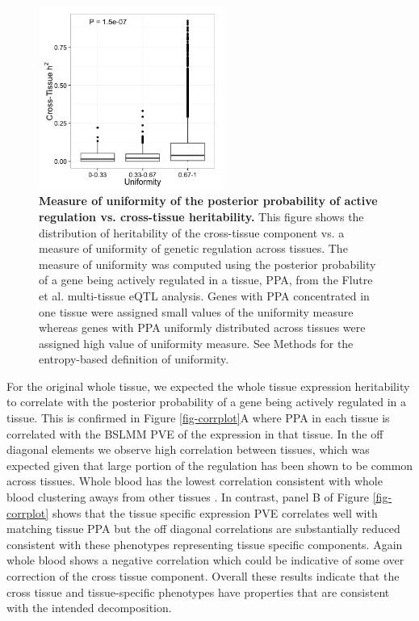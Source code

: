 \documentclass[10pt,letterpaper]{article}
\begin{document}
\begin{figure}[H]
\includegraphics[width=6cm]{Figures/Fig-CT-entropy.png}
\caption{{\bf Measure of uniformity of the posterior probability of active regulation vs. cross-tissue heritability.}
This figure shows the distribution of heritability of the cross-tissue component vs. a measure of uniformity of genetic regulation across tissues. 
The measure of uniformity was computed using the posterior probability of a gene being actively regulated in a tissue, PPA, from the Flutre et al. \cite{Flutre_2013} multi-tissue eQTL analysis. Genes with PPA concentrated in one tissue were assigned small values of the uniformity measure whereas genes with PPA uniformly distributed across tissues were assigned high value of uniformity measure. See Methods for the entropy-based definition of uniformity.}
\label{fig-ct-entropy}
\end{figure}


For the original whole tissue, we expected the whole tissue expression heritability to correlate with the posterior probability of a gene being actively regulated in a tissue. This is confirmed in Figure \ref{fig-corrplot}A where PPA in each tissue is correlated with the BSLMM PVE of the expression in that tissue. In the off diagonal elements we observe high correlation between tissues, which was expected given that large portion of the regulation has been shown to be common across tissues. Whole blood has the lowest correlation  consistent with whole blood clustering aways from other tissues \cite{Ardlie_2015}. In contrast, panel B of Figure \ref{fig-corrplot} shows that the tissue specific expression PVE correlates well with matching tissue PPA but the off diagonal correlations are substantially reduced consistent with these phenotypes representing tissue specific components. Again whole blood shows a negative correlation which could be indicative of some over correction of the cross tissue component. Overall these results indicate that the cross tissue and tissue-specific phenotypes have properties that are consistent with the intended decomposition.
\end{document}

